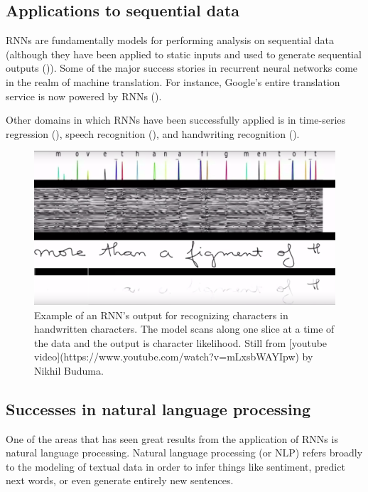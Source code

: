 \documentclass[]{book}
\theoremstyle{definition}
\theoremstyle{definition}
\theoremstyle{definition}
\theoremstyle{remark}
\begin{document}
\subsection{Applications to sequential
data}\label{applications-to-sequential-data}

RNNs are fundamentally models for performing analysis on sequential data
(although they have been applied to static inputs and used to generate
sequential outputs (\citet{rnn_captions})). Some of the major success
stories in recurrent neural networks come in the realm of machine
translation. For instance, Google's entire translation service is now
powered by RNNs (\citet{google_translate}).

Other domains in which RNNs have been successfully applied is in
time-series regression (\citet{rnn_regression}), speech recognition
(\citet{rnn_speach}), and handwriting recognition
(\citet{rnn_handwriting}).

\begin{figure}

{\centering \includegraphics[width=0.9\linewidth]{figures/handwriting_rnn} 

}

\caption{Example of an RNN's output for recognizing characters in handwritten characters. The model scans along one slice at a time of the data and the output is character likelihood. Still from [youtube video](https://www.youtube.com/watch?v=mLxsbWAYIpw) by Nikhil Buduma.}\label{fig:unnamed-chunk-3}
\end{figure}

\subsection{Successes in natural language
processing}\label{successes-in-natural-language-processing}

One of the areas that has seen great results from the application of
RNNs is natural language processing. Natural language processing (or
NLP) refers broadly to the modeling of textual data in order to infer
things like sentiment, predict next words, or even generate entirely new
sentences.
\end{document}
